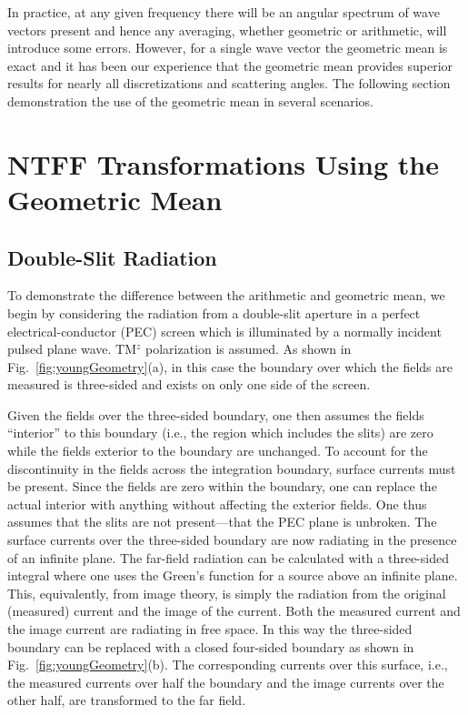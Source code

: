 In practice, at any given frequency there will be an angular spectrum
of wave vectors present and hence any averaging, whether geometric or
arithmetic, will introduce some errors.  However, for a single wave
vector the geometric mean is exact and it has been our experience that
the geometric mean provides superior results for nearly all
discretizations and scattering angles.  The following section
demonstration the use of the geometric mean in several scenarios.

\section{NTFF Transformations Using the Geometric Mean
\label{sec:gmNtffResults}}

\subsection{Double-Slit Radiation}

To demonstrate the difference between the arithmetic and geometric
mean, we begin by considering the radiation from a double-slit
aperture in a perfect electrical-conductor (PEC) screen which is
illuminated by a normally incident pulsed plane wave.  TM$^z$
polarization is assumed.  As shown in Fig.\
\ref{fig:youngGeometry}(a), in this case the boundary over which the
fields are measured is three-sided and exists on only one side of the
screen.

Given the fields over the three-sided boundary, one then assumes the
fields ``interior'' to this boundary (i.e., the region which includes
the slits) are zero while the fields exterior to the boundary are
unchanged.  To account for the discontinuity in the fields across the
integration boundary, surface currents must be present.  Since the
fields are zero within the boundary, one can replace the actual
interior with anything without affecting the exterior fields.  One
thus assumes that the slits are not present---that the PEC plane is
unbroken.  The surface currents over the three-sided boundary are now
radiating in the presence of an infinite plane.  The far-field
radiation can be calculated with a three-sided integral where one uses
the Green's function for a source above an infinite plane.  This,
equivalently, from image theory, is simply the radiation from the
original (measured) current and the image of the current.  Both the
measured current and the image current are radiating in free space.
In this way the three-sided boundary can be replaced with a closed
four-sided boundary as shown in Fig.\ \ref{fig:youngGeometry}(b).  The
corresponding currents over this surface, i.e., the measured currents
over half the boundary and the image currents over the other half, are
transformed to the far field.  

